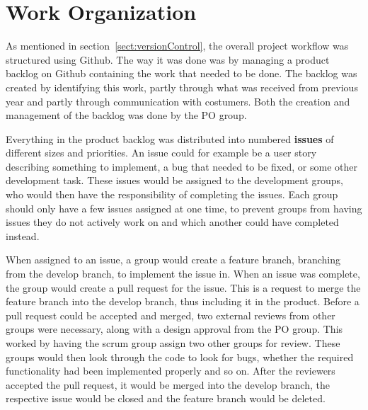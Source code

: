 \section{Work Organization}
\label{sec:workOrganization}
As mentioned in section~\ref{sect:versionControl}, the overall project workflow was structured using Github. The way it was done was by managing a product backlog on Github containing the work that needed to be done. The backlog was created by identifying this work, partly through what was received from previous year and partly through communication with costumers. Both the creation and management of the backlog was done by the PO group. 

Everything in the product backlog was distributed into numbered \textbf{issues} of different sizes and priorities. An issue could for example be a user story describing something to implement, a bug that needed to be fixed, or some other development task. 
These issues would be assigned to the development groups, who would then have the responsibility of completing the issues. 
Each group should only have a few issues assigned at one time, to prevent groups from having issues they do not actively work on and which another could have completed instead. 

When assigned to an issue, a group would create a feature branch, branching from the develop branch, to implement the issue in. 
When an issue was complete, the group would create a pull request for the issue. This is a request to merge the feature branch into the develop branch, thus including it in the product. 
Before a pull request could be accepted and merged, two external reviews from other groups were necessary, along with a design approval from the PO group. This worked by having the scrum group assign two other groups for review. These groups would then look through the code to look for bugs, whether the required functionality had been implemented properly and so on. 
After the reviewers accepted the pull request, it would be merged into the develop branch, the respective issue would be closed and the feature branch would be deleted. 

